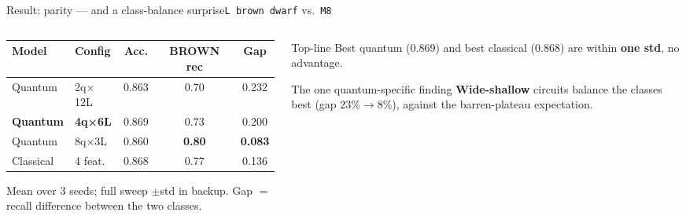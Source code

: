 \begin{frame}{Result: parity --- and a class-balance surprise}{\texttt{L brown dwarf} vs.\ \texttt{M8}}
    \begin{columns}[T]
        \begin{column}{0.6\textwidth}
            \centering\footnotesize
            \setlength{\tabcolsep}{4pt}
            \begin{tabular}{llccc}
                \toprule
                Model            & Config         & Acc.             & BROWN rec     & Gap            \\
                \midrule
                Quantum          & 2q$\times$12L  & $0.863$          & 0.70          & 0.232          \\
                \textbf{Quantum} & \textbf{4q×6L} & $\mathbf{0.869}$ & 0.73          & 0.200          \\
                Quantum          & 8q$\times$3L   & $0.860$          & \textbf{0.80} & \textbf{0.083} \\
                Classical        & 4 feat.        & $0.868$          & 0.77          & 0.136          \\
                \bottomrule
            \end{tabular}
            \par\vspace{3pt}
            {\scriptsize\color{zhawgrey}Mean over 3 seeds; full sweep $\pm$std in
                backup. Gap $=$ recall difference between the two classes.}
        \end{column}
        \begin{column}{0.38\textwidth}
            \begin{block}{Top-line}
                Best quantum (0.869) and best classical (0.868) are within
                \textbf{one std}, no advantage.
            \end{block}
            \begin{exampleblock}{The one quantum-specific finding}
                \textbf{Wide-shallow} circuits balance the classes best
                (gap $23\%\!\to\!8\%$), against the barren-plateau expectation.
            \end{exampleblock}
        \end{column}
    \end{columns}
\end{frame}


